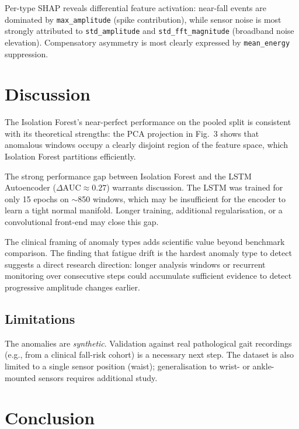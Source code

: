 \documentclass[conference]{IEEEtran}
\begin{document}
Per-type SHAP reveals differential feature activation:
near-fall events are dominated by \texttt{max\_amplitude} (spike
contribution), while sensor noise is most strongly attributed to
\texttt{std\_amplitude} and \texttt{std\_fft\_magnitude} (broadband
noise elevation).
Compensatory asymmetry is most clearly expressed by
\texttt{mean\_energy} suppression.

\section{Discussion}

The Isolation Forest's near-perfect performance on the pooled split is
consistent with its theoretical strengths: the PCA projection in
Fig.~3 shows that anomalous windows occupy a clearly disjoint region of
the feature space, which Isolation Forest partitions efficiently.

The strong performance gap between Isolation Forest and the LSTM
Autoencoder ($\Delta\text{AUC} \approx 0.27$) warrants discussion.
The LSTM was trained for only 15 epochs on $\sim$850 windows, which
may be insufficient for the encoder to learn a tight normal manifold.
Longer training, additional regularisation, or a convolutional front-end
may close this gap.

The clinical framing of anomaly types adds scientific value beyond
benchmark comparison.
The finding that fatigue drift is the hardest anomaly type to detect
suggests a direct research direction: longer analysis windows or
recurrent monitoring over consecutive steps could accumulate sufficient
evidence to detect progressive amplitude changes earlier.

\subsection{Limitations}

The anomalies are \emph{synthetic}.
Validation against real pathological gait recordings
(e.g., from a clinical fall-risk cohort) is a necessary next step.
The dataset is also limited to a single sensor position (waist);
generalisation to wrist- or ankle-mounted sensors requires additional
study.

\section{Conclusion}
\end{document}
